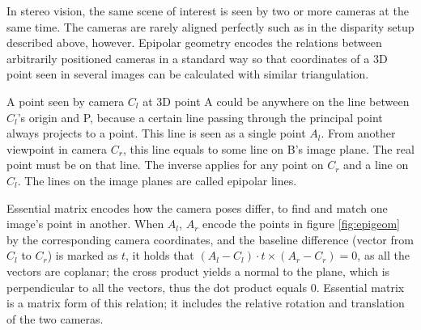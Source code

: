 In stereo vision, the same scene of interest is seen by two or more cameras at the same time.
The cameras are rarely aligned perfectly such as in the disparity setup described above, however.
Epipolar geometry encodes the relations between arbitrarily positioned cameras in a standard way so that coordinates of a 3D point seen in several images can be calculated with similar triangulation.

A point seen by camera $C_l$ at 3D point A could be anywhere on the line between $C_l$'s origin and P, because a certain line passing through the principal point always projects to a point.
This line is seen as a single point $A_l$.
From another viewpoint in camera $C_r$, this line equals to some line on B's image plane.
The real point must be on that line.
The inverse applies for any point on $C_r$ and a line on $C_l$.
The lines on the image planes are called epipolar lines.

Essential matrix encodes how the camera poses differ, to find and match one image's point in another.
When $A_l$, $A_r$ encode the points in figure \ref{fig:epigeom} by the corresponding camera coordinates, and the baseline difference (vector from $C_l$ to $C_r$) is marked as $t$, it holds that $(A_l-C_l) \cdot t \times (A_r-C_r) = 0$, as all the vectors are coplanar; the cross product yields a normal to the plane, which is perpendicular to all the vectors, thus the dot product equals 0.
\cite{hartley03multiview}
Essential matrix is a matrix form of this relation; it includes the relative rotation and translation of the two cameras.


%
%

